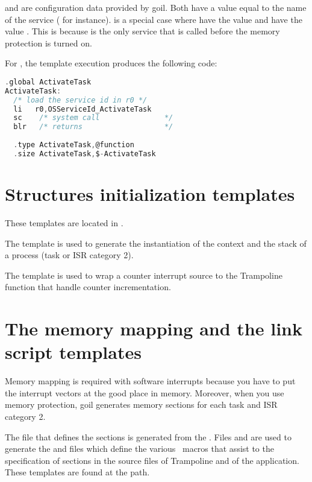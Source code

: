  and  are configuration data provided by goil. Both have a value equal to the name of the service ( for instance).  is a special case where  have the value  and  have the value . This is because  is the only service that is called before the memory protection is turned on.

For , the template execution produces the following code:

\begin{lstlisting}[language=C]
  .global ActivateTask
ActivateTask:
  /* load the service id in r0 */
  li   r0,OSServiceId_ActivateTask
  sc    /* system call               */
  blr   /* returns                   */
  
  .type ActivateTask,@function
  .size ActivateTask,$-ActivateTask
\end{lstlisting}

\section{Structures initialization templates}

These templates are located in .

The   template  is used to generate the instantiation of the context and the stack of a process (task or ISR category 2). 

The template  is used to wrap a counter interrupt source to the Trampoline function that handle counter incrementation.

\section{The memory mapping and the link script templates}

Memory mapping is required with software interrupts because you have to put the interrupt vectors at the good place in memory. Moreover, when you use memory protection, goil generates memory sections for each task and ISR category 2.

The  file that defines the sections is generated from the . Files  and  are used to generate the  and  files which define the various \autosar\ macros that assist to the specification of sections in the source files of Trampoline and of the application. These templates are found at the  path.


